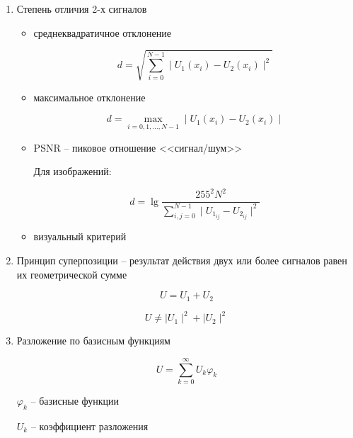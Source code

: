 \begin{enumerate}
    \item Степень отличия 2-х сигналов

        \begin{itemize}
            \item среднеквадратичное отклонение

                \begin{equation*}
                    d =  \sqrt{\sum_{i=0}^{N-1}  \mid U_1(x_i) - U_2(x_i) \mid^2}
                \end{equation*}

            \item максимальное отклонение

                \begin{equation*}
                    d = \max_{i=0,1, \ldots , N-1} \mid U_1(x_i) - U_2(x_i) \mid
                \end{equation*}

            \item PSNR -- пиковое отношение <<сигнал/шум>>

                Для изображений:

                \begin{equation*}
                    d = \lg \frac{255^2 N^2}{\sum_{i,j=0}^{N-1} \mid U_{1_{ij}} - U_{2_{ij}} \mid^2}
                \end{equation*}

            \item визуальный критерий
        \end{itemize}

    \item Принцип суперпозиции -- результат действия двух или более сигналов равен их геометрической сумме

        \begin{equation*}
            U = U_1 + U_2
        \end{equation*}

        \begin{equation*}
            U \ne \mid U_1 \mid^2 + \mid U_2 \mid^2
        \end{equation*}

    \item Разложение по базисным функциям

        \begin{equation*}
            U = \sum_{k=0}^{\infty} U_k \varphi_k
        \end{equation*}

        $\varphi_k$ -- базисные функции

        $U_k$ -- коэффициент разложения
\end{enumerate}

